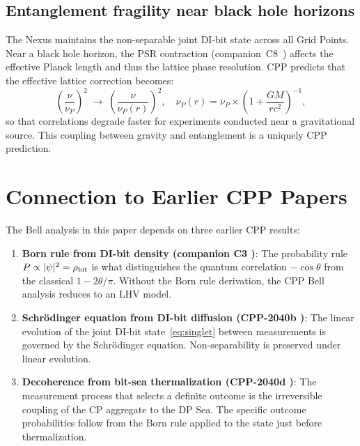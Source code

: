 \documentclass[11pt,a4paper]{article}
\begin{document}
\subsection{Entanglement fragility near black hole horizons}

The Nexus maintains the non-separable joint DI-bit state across all
Grid Points.  Near a black hole horizon, the PSR contraction
(companion~C8~\citep{abshier2026gr8}) affects the effective Planck
length and thus the lattice phase resolution.  CPP predicts that
the effective lattice correction becomes:
\begin{equation}
\left(\frac{\nu}{\nu_P}\right)^2 \;\to\;
\left(\frac{\nu}{\nu_P(r)}\right)^2, \quad
\nu_P(r) = \nu_P \times \left(1 + \frac{GM}{rc^2}\right)^{-1},
\end{equation}
so that correlations degrade faster for experiments conducted near
a gravitational source.  This coupling between gravity and entanglement
is a uniquely CPP prediction.

\section{Connection to Earlier CPP Papers}
\label{sec:connections}

The Bell analysis in this paper depends on three earlier CPP results:

\begin{enumerate}
\item \textbf{Born rule from DI-bit density (companion C3
  \citep{abshier2026born})}: The probability rule
  $P \propto |\psi|^2 = \rho_{\rm bit}$ is what distinguishes the
  quantum correlation $-\cos\theta$ from the classical
  $1 - 2\theta/\pi$.  Without the Born rule derivation, the CPP
  Bell analysis reduces to an LHV model.

\item \textbf{Schr\"{o}dinger equation from DI-bit diffusion
  (CPP-2040b \citep{cpp2040b})}: The linear evolution of the joint
  DI-bit state~\eqref{eq:singlet} between measurements is governed
  by the Schr\"{o}dinger equation.  Non-separability is preserved
  under linear evolution.

\item \textbf{Decoherence from bit-sea thermalization (CPP-2040d
  \citep{cpp2040d})}: The measurement process that selects a definite
  outcome is the irreversible coupling of the CP aggregate to the DP
  Sea.  The specific outcome probabilities follow from the Born rule
  applied to the state just before thermalization.
\end{enumerate}
\end{document}
